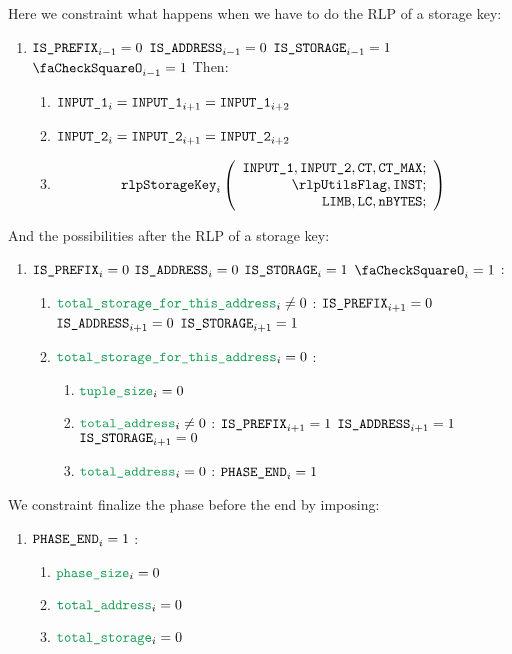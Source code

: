 \begin{enumerate}[resume]
		Here we constraint what happens when we have to do the RLP of a storage key: 
		\begin{enumerate}[resume]
			\item \If $\texttt{IS\_PREFIX}_{i-1} = 0$ \et $\texttt{IS\_ADDRESS}_{i-1} = 0$ \et $\texttt{IS\_STORAGE}_{i-1} = 1$ \et $\done_{i-1} =1$ Then:
				\begin{enumerate}
					\item $\texttt{INPUT\_1}_{i} = \texttt{INPUT\_1}_{i+1} = \texttt{INPUT\_1}_{i+2}$
					\item $\texttt{INPUT\_2}_{i} = \texttt{INPUT\_2}_{i+1} = \texttt{INPUT\_2}_{i+2}$
					\item \[
							\rlpStorageKey_{i}
							\left(
							\begin{array}{r}
								\inputColumn{1},
								\inputColumn{2},
								\ct,
								\maxCt; \\
								\rlpUtilsFlag,
								\INST; \\
								\limb,
								\lc,
								\limbsize; \\
							\end{array}
							\right)
						\]
				\end{enumerate}
		\end{enumerate}
		And the possibilities after the RLP of a storage key:
		\begin{enumerate}[resume]
			\item \If $\texttt{IS\_PREFIX}_{i} = 0$ \et $\texttt{IS\_ADDRESS}_{i} = 0$ \et $\texttt{IS\_STORAGE}_{i} = 1$ \et $\done_{i} =1$ \Then:
				\begin{enumerate}
					\item \If $\locTotStorageForThisAddress_{i} \neq 0$ \Then: $\texttt{IS\_PREFIX}_{i+1} = 0$ \et $\texttt{IS\_ADDRESS}_{i+1} = 0$ \et $\texttt{IS\_STORAGE}_{i+1} = 1$
					\item \If $\locTotStorageForThisAddress_{i} = 0$ \Then: 
						\begin{enumerate}
							\item $\locAccessListTupleSize_{i} = 0$
							\item \If $\locTotNbOfAddress_{i} \neq 0$ \Then: $\texttt{IS\_PREFIX}_{i+1} = 1$ \et $\texttt{IS\_ADDRESS}_{i+1} = 1$ \et $\texttt{IS\_STORAGE}_{i+1} = 0$
							\item \If $\locTotNbOfAddress_{i} = 0$ \Then: $\texttt{PHASE\_END}_{i} =1$
						\end{enumerate}
				\end{enumerate}
		\end{enumerate}

		We constraint finalize the phase before the end by imposing:
		\begin{enumerate}
			\item \If $\texttt{PHASE\_END}_{i} =1$ \Then: 
				\begin{enumerate}
					\item $\locPhaseSize_{i} =0$
					\item $\locTotNbOfAddress_{i} =0$
					\item $\locTotNbOfStorage_{i} =0$
				\end{enumerate}
		\end{enumerate}


\end{enumerate}
